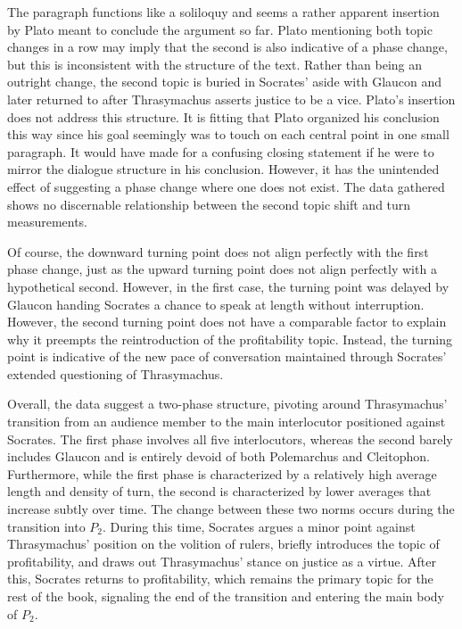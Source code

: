 \documentclass[noraggedright]{turabian-researchpaper}
\begin{document}
\noindent The paragraph functions like a soliloquy and seems a rather apparent insertion by Plato meant to conclude the argument so far. Plato mentioning both topic changes in a row may imply that the second is also indicative of a phase change, but this is inconsistent with the structure of the text. Rather than being an outright change, the second topic is buried in Socrates' aside with Glaucon and later returned to after Thrasymachus asserts justice to be a vice. Plato's insertion does not address this structure. It is fitting that Plato organized his conclusion this way since his goal seemingly was to touch on each central point in one small paragraph. It would have made for a confusing closing statement if he were to mirror the dialogue structure in his conclusion. However, it has the unintended effect of suggesting a phase change where one does not exist. The data gathered shows no discernable relationship between the second topic shift and turn measurements.

Of course, the downward turning point does not align perfectly with the first phase change, just as the upward turning point does not align perfectly with a hypothetical second. However, in the first case, the turning point was delayed by Glaucon handing Socrates a chance to speak at length without interruption. However, the second turning point does not have a comparable factor to explain why it preempts the reintroduction of the profitability topic. Instead, the turning point is indicative of the new pace of conversation maintained through Socrates' extended questioning of Thrasymachus.

\vspace*{1\baselineskip}
\noindent Overall, the data suggest a two-phase structure, pivoting around Thrasymachus' transition from an audience member to the main interlocutor positioned against Socrates. The first phase involves all five interlocutors, whereas the second barely includes Glaucon and is entirely devoid of both Polemarchus and Cleitophon. Furthermore, while the first phase is characterized by a relatively high average length and density of turn, the second is characterized by lower averages that increase subtly over time. The change between these two norms occurs during the transition into $P_2$. During this time, Socrates argues a minor point against Thrasymachus' position on the volition of rulers, briefly introduces the topic of profitability, and draws out Thrasymachus' stance on justice as a virtue. After this, Socrates returns to profitability, which remains the primary topic for the rest of the book, signaling the end of the transition and entering the main body of $P_2$.

\clearpage
\nocite{*}
\printbibliography[keyword={texts}]
\printbibliography[keyword={packages},title={Software}]
\end{document}
